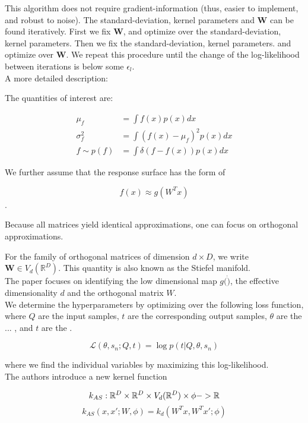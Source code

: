This algorithm does not require gradient-information (thus, easier to implement, and robust to noise).
The standard-deviation, kernel parameters and  $ \mathbf{W} $ can be found iteratively.
First we fix $ \mathbf{W} $, and optimize over the standard-deviation, kernel parameters.
Then we fix the standard-deviation, kernel parameters. and optimize over $ \mathbf{W} $.
We repeat this procedure until the change of the log-likelihood between iterations is below some $ \epsilon_l $.\\

A more detailed description:

The quantities of interest are:

\begin{align}
\mu_f &= \int f(x) p(x) dx \\
\sigma^2_f &= \int ( f(x) - \mu_f )^2 p(x) dx \\
f \sim p(f) &= \int \delta( f - f(x) ) p(x) dx
\end{align}

We further assume that the response surface has the form of 

$$
f(x) \approx g(W^T x)
$$.

Because all matrices yield identical approximations, one can focus on orthogonal approximations.

For the family of orthogonal matrices of dimension $d \times D$, we write $\mathbf{W} \in V_d(\mathbb{R}^D) $.
This quantity is also known as the Stiefel manifold. \\

The paper focuses on identifying the low dimensional map $g( \dot )$, the effective dimensionality $d$ and the orthogonal matrix $W$.\\

We determine the hyperparameters by optimizing over the following loss function, where $Q$ are the input samples, $t$ are the corresponding output samples, $\theta$ are the ... , and $t$ are the .

$$
\mathcal{L} (\theta, s_n; Q, t) = \log p(t | Q, \theta, s_n)
$$

where we find the individual variables by maximizing this log-likelihood. \\

The authors introduce a new kernel function 

\begin{equation}
k_{AS} : \mathbb{R}^D \times \mathbb{R}^D \times V_d(\mathbb{R}^D) \times \phi -> \mathbb{R} \\
\end{equation}
\begin{equation}
k_{AS} (x, x'; W, \phi) = k_d(W^T x, W^T x'; \phi)
\end{equation}

